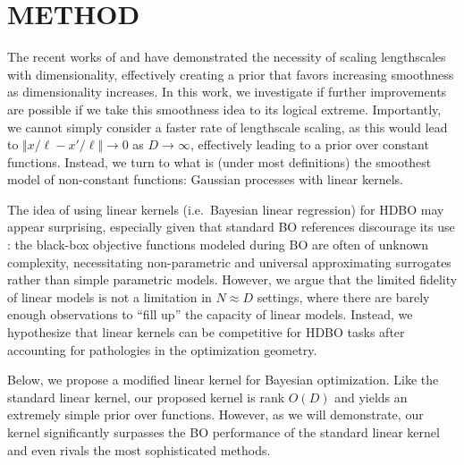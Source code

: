 \documentclass[twoside]{article}
\theoremstyle{plain}
\theoremstyle{definition}
\begin{document}
\section{\bfseries\small METHOD} \label{sec:method}
The recent works of \cite{hvarfner2024vanilla} and \cite{xu2025standard} have demonstrated the necessity of scaling lengthscales with dimensionality,
effectively creating a prior that favors increasing smoothness as dimensionality increases.
In this work, we investigate if further improvements are possible if we take this smoothness idea to its logical extreme.
Importantly, we cannot simply consider a faster rate of lengthscale scaling,
as this would lead to $\Vert x/\ell - x'/\ell \Vert \to 0$ as $D \to \infty$,
effectively leading to a prior over constant functions.
Instead, we turn to what is (under most definitions) the smoothest model of non-constant functions: Gaussian processes with linear kernels.

The idea of using linear kernels (i.e.\ Bayesian linear regression) for HDBO may appear surprising,
especially given that standard BO references discourage  its use \citep{shahriari2015taking, garnett2023bayesian}: the black-box objective functions modeled during BO are often of unknown complexity,
necessitating non-parametric and universal approximating surrogates rather than simple parametric models.
However, we argue that the limited fidelity of linear models is not a limitation in $N \approx D$ settings, where there are barely enough observations to ``fill up'' the capacity of linear models.
Instead, we hypothesize that linear kernels can be competitive for HDBO tasks after accounting for pathologies in the optimization geometry.

Below, we propose a modified linear kernel for Bayesian optimization.
Like the standard linear kernel, our proposed kernel is rank $O(D)$ and yields an extremely simple prior over functions.
However, as we will demonstrate, our kernel significantly surpasses the BO performance of the standard linear kernel and even rivals the most sophisticated methods.
\end{document}
